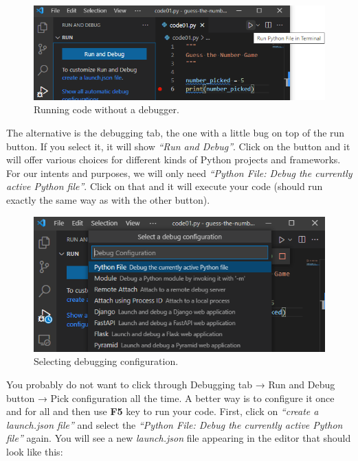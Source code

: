 \documentclass[
]{book}
\begin{document}
\begin{figure}
\centering
\includegraphics{images/debug-vs-run.png}
\caption{Running code without a debugger.}
\end{figure}

The alternative is the debugging tab, the one with a little bug on top of the run button. If you select it, it will show \emph{``Run and Debug''}. Click on the button and it will offer various choices for different kinds of Python projects and frameworks. For our intents and purposes, we will only need \emph{``Python File: Debug the currently active Python file''}. Click on that and it will execute your code (should run exactly the same way as with the other button).

\begin{figure}
\centering
\includegraphics{images/debug-select-debug-configuration.png}
\caption{Selecting debugging configuration.}
\end{figure}

You probably do not want to click through Debugging tab → Run and Debug button → Pick configuration all the time. A better way is to configure it once and for all and then use \textbf{F5} key to run your code. First, click on \emph{``create a launch.json file''} and select the \emph{``Python File: Debug the currently active Python file''} again. You will see a new \emph{launch.json} file appearing in the editor that should look like this:
\end{document}
